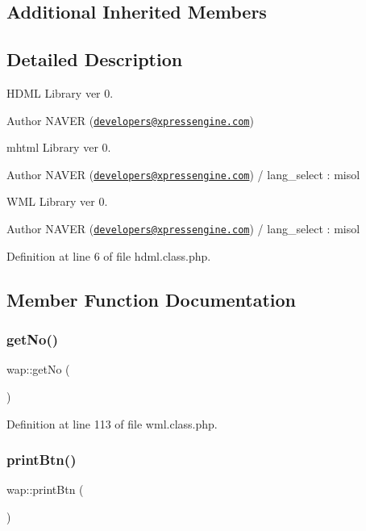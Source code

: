 \subsection*{Additional Inherited Members}


\subsection{Detailed Description}
H\+D\+ML Library ver 0. \begin{DoxyAuthor}{Author}
N\+A\+V\+ER (\href{mailto:developers@xpressengine.com}{\tt developers@xpressengine.\+com})
\end{DoxyAuthor}
mhtml Library ver 0. \begin{DoxyAuthor}{Author}
N\+A\+V\+ER (\href{mailto:developers@xpressengine.com}{\tt developers@xpressengine.\+com}) / lang\+\_\+select \+: misol
\end{DoxyAuthor}
W\+ML Library ver 0. \begin{DoxyAuthor}{Author}
N\+A\+V\+ER (\href{mailto:developers@xpressengine.com}{\tt developers@xpressengine.\+com}) / lang\+\_\+select \+: misol 
\end{DoxyAuthor}


Definition at line 6 of file hdml.\+class.\+php.



\subsection{Member Function Documentation}
\mbox{\label{classwap_a4ac2316bf5cb56e0c351a97e04142e28}} 
\subsubsection{\texorpdfstring{get\+No()}{getNo()}}
{\footnotesize\ttfamily wap\+::get\+No (\begin{DoxyParamCaption}{ }\end{DoxyParamCaption})}



Definition at line 113 of file wml.\+class.\+php.

\mbox{\label{classwap_a47437aad53e77ce53aebb4db6240cc38}} 
\subsubsection{\texorpdfstring{print\+Btn()}{printBtn()}\hspace{0.1cm}{\footnotesize\ttfamily [1/3]}}
{\footnotesize\ttfamily wap\+::print\+Btn (\begin{DoxyParamCaption}{ }\end{DoxyParamCaption})}



